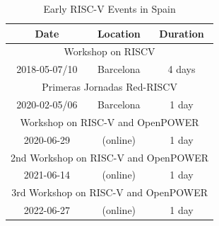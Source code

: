 \begin{table}[h]
  \small
  \centering
  \caption{Early RISC-V Events in Spain}
  \label{table-sp}
  \begin{tabular}{ccc}
    \toprule\toprule
    \bf Date & \bf Location & \bf Duration \\
    \midrule\midrule
    \multicolumn{3}{c}{Workshop on RISCV} \cite{BCN-2018} \\
    \midrule
    2018-05-07/10 & Barcelona & 4 days \\
    \midrule\midrule
    \multicolumn{3}{c}{Primeras Jornadas Red-RISCV} \cite{RED} \\
    \midrule
    2020-02-05/06 & Barcelona & 1 day \\
    \midrule\midrule
    \multicolumn{3}{c}{Workshop on RISC-V and OpenPOWER} \cite{RV-PPC-1} \\
    \midrule
    2020-06-29 & (online) & 1 day \\
    \midrule\midrule
    \multicolumn{3}{c}{2nd Workshop on RISC-V and OpenPOWER} \cite{RV-PPC-2} \\
    \midrule
    2021-06-14 & (online) & 1 day \\
    \midrule\midrule
    \multicolumn{3}{c}{3rd Workshop on RISC-V and OpenPOWER} \cite{RV-PPC-3} \\
    \midrule
    2022-06-27 & (online) & 1 day \\
    \bottomrule\bottomrule
  \end{tabular}
\end{table}
